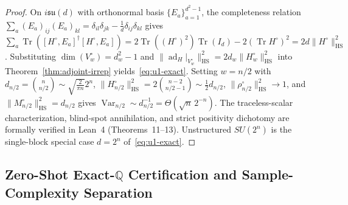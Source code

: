 \documentclass[11pt,a4paper]{article}
\theoremstyle{definition}
\theoremstyle{remark}
\newcommand{\QQ}{\mathbb{Q}}
\newcommand{\Tr}{\operatorname{Tr}}
\newcommand{\Var}{\operatorname{Var}}
\newcommand{\ad}{\operatorname{ad}}
\newcommand{\HS}{\mathrm{HS}}
\newcommand{\su}{\mathfrak{su}}
\begin{document}
\begin{proof}
On $i\su(d)$ with orthonormal basis $\{E_a\}_{a=1}^{d^2-1}$, the completeness relation $\sum_a (E_a)_{ij}(E_a)_{kl} = \delta_{il}\delta_{jk} - \frac{1}{d}\delta_{ij}\delta_{kl}$ gives $\sum_a \Tr([H^\circ, E_a]^\dagger [H^\circ, E_a]) = 2\Tr((H^\circ)^2)\Tr(I_d) - 2(\Tr H^\circ)^2 = 2 d \|H^\circ\|_{\HS}^2$. Substituting $\dim(V_w^\circ) = d_w^2 - 1$ and $\|\ad_H|_{V_w^\circ}\|_{\HS}^2 = 2 d_w \|H_w^\circ\|_{\HS}^2$ into Theorem~\ref{thm:adjoint-irrep} yields~\eqref{eq:u1-exact}. Setting $w = n/2$ with $d_{n/2} = \binom{n}{n/2} \sim \sqrt{\frac{2}{\pi n}} 2^n$, $\|H_{n/2}^\circ\|_{\HS}^2 = 2\binom{n-2}{n/2-1} \sim \frac{1}{2} d_{n/2}$, $\|\rho_{n/2}^\circ\|_{\HS}^2 \to 1$, and $\|M_{n/2}^\circ\|_{\HS}^2 = d_{n/2}$ gives $\Var_{n/2} \sim d_{n/2}^{-1} = \Theta(\sqrt{n}\,2^{-n})$. The traceless-scalar characterization, blind-spot annihilation, and strict positivity dichotomy are formally verified in Lean~4 (Theorems~11--13). Unstructured $SU(2^n)$ is the single-block special case $d = 2^n$ of~\eqref{eq:u1-exact}.
\end{proof}

\subsection{Zero-Shot Exact-\texorpdfstring{$\QQ$}{Q} Certification and Sample-Complexity Separation}
\end{document}
